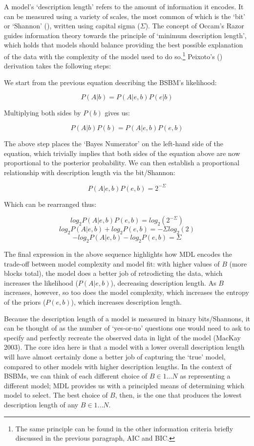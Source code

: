 \documentclass[
  12pt,
  a4paper,
  DIV=11,
  numbers=noendperiod,
  twoside,
  open=any]{scrartcl}
\begin{document}
A model's `description length' refers to the amount of information it
encodes. It can be measured using a variety of scales, the most common
of which is the `bit' or `Shannon'
(), written using
capital sigma (\(\Sigma\)). The concept of Occam's Razor guides
information theory towards the principle of `minimum description
length', which holds that models should balance providing the best
possible explanation of the data with the complexity of the model used
to do so.\footnote{The same principle can be found in the other
  information criteria briefly discussed in the previous paragraph, AIC
  and BIC.} Peixoto's ()
derivation takes the following steps:

We start from the previous equation describing the BSBM's likelihood:

\[
P(A|b)=P(A|e,b)P(e|b)
\]

Multiplying both sides by \(P(b)\) gives us:

\[
P(A|b)P(b)=P(A|e,b)P(e,b)
\]

The above step places the `Bayes Numerator' on the left-hand side of the
equation, which trivially implies that both sides of the equation above
are now proportional to the posterior probability. We can then establish
a proportional relationship with description length via the bit/Shannon:

\[
P(A|e,b)P(e,b)=2^{-\Sigma}
\]

Which can be rearranged thus:

\[
log_2 P(A|e,b)P(e,b)=log_2 (2^{-\Sigma})
\] \[ 
log_2 P(A|e,b) + log_2 P(e,b) = -\Sigma log_2 (2)
\] \[
-log_2 P(A|e,b) - log_2 P(e,b ) = \Sigma
\]

The final expression in the above sequence highlights how MDL encodes
the trade-off between model complexity and model fit: with higher values
of \(B\) (more blocks total), the model does a better job of
retrodicting the data, which increases the likelihood (\(P(A|e,b)\)),
decreasing description length. As \(B\) increases, however, so too does
the model complexity, which increases the entropy of the priors
(\(P(e,b)\)), which increases description length.

Because the description length of a model is measured in binary
bits/Shannons, it can be thought of as the number of `yes-or-no'
questions one would need to ask to specify and perfectly recreate the
observed data in light of the model (MacKay 2003). The core idea here is
that a model with a lower overall description length will have almost
certainly done a better job of capturing the `true' model, compared to
other models with higher description lengths. In the context of BSBMs,
we can think of each different choice of \(B\in{1...N}\) as representing
a different model; MDL provides us with a principled means of
determining which model to select. The best choice of \(B\), then, is
the one that produces the lowest description length of any
\(B\in{1...N}\).
\end{document}

